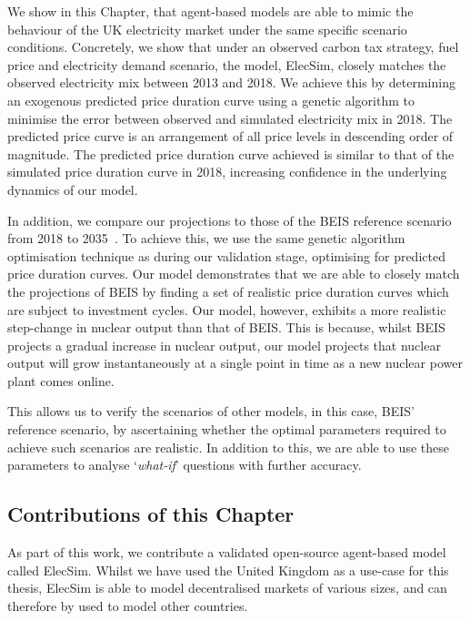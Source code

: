 
We show in this Chapter, that agent-based models are able to mimic the behaviour of the UK electricity market under the same specific scenario conditions. Concretely, we show that under an observed carbon tax strategy, fuel price and electricity demand scenario, the model, ElecSim, closely matches the observed electricity mix between 2013 and 2018. We achieve this by determining an exogenous predicted price duration curve using a genetic algorithm to minimise the error between observed and simulated electricity mix in 2018. The predicted price curve is an arrangement of all price levels in descending order of magnitude. The predicted price duration curve achieved is similar to that of the simulated price duration curve in 2018, increasing confidence in the underlying dynamics of our model. 

In addition, we compare our projections to those of the BEIS reference scenario from 2018 to 2035~\cite{DBEIS2019}. To achieve this, we use the same genetic algorithm optimisation technique as during our validation stage, optimising for predicted price duration curves. Our model demonstrates that we are able to closely match the projections of BEIS by finding a set of realistic price duration curves which are subject to investment cycles. Our model, however, exhibits a more realistic step-change in nuclear output than that of BEIS. This is because, whilst BEIS projects a gradual increase in nuclear output, our model projects that nuclear output will grow instantaneously at a single point in time as a new nuclear power plant comes online. 

This allows us to verify the scenarios of other models, in this case, BEIS' reference scenario, by ascertaining whether the optimal parameters required to achieve such scenarios are realistic. In addition to this, we are able to use these parameters to analyse `\textit{what-if}' questions with further accuracy.


\subsection{Contributions of this Chapter}

As part of this work, we contribute a validated open-source agent-based model called ElecSim. Whilst we have used the United Kingdom as a use-case for this thesis, ElecSim is able to model decentralised markets of various sizes, and can therefore by used to model other countries. 

